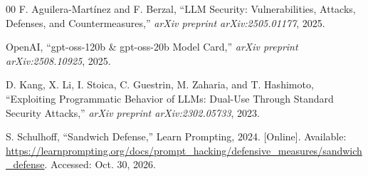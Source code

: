 \documentclass[twocolumn]{article}
\renewcommand{\thesection}{\Roman{section}}
\begin{document}
\begin{thebibliography}{00}
F. Aguilera-Martínez and F. Berzal, ``LLM Security: Vulnerabilities, Attacks, Defenses, and Countermeasures,'' \textit{arXiv preprint arXiv:2505.01177}, 2025.

OpenAI, ``gpt-oss-120b \& gpt-oss-20b Model Card,'' \textit{arXiv preprint arXiv:2508.10925}, 2025.

D. Kang, X. Li, I. Stoica, C. Guestrin, M. Zaharia, and T. Hashimoto, ``Exploiting Programmatic Behavior of LLMs: Dual-Use Through Standard Security Attacks,'' \textit{arXiv preprint arXiv:2302.05733}, 2023.

S. Schulhoff, ``Sandwich Defense,'' Learn Prompting, 2024. [Online]. Available: \url{https://learnprompting.org/docs/prompt_hacking/defensive_measures/sandwich_defense}. Accessed: Oct. 30, 2026.

\end{thebibliography}

\appendix
\renewcommand{\thesection}{\Alph{section}}
\setcounter{section}{0}


\end{document}

